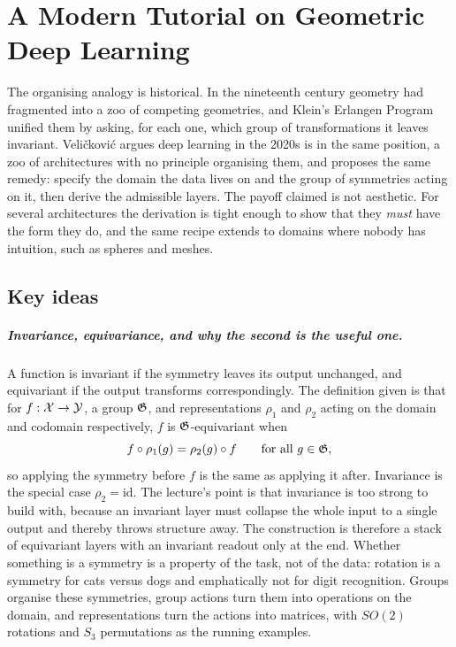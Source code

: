 \chapter{A Modern Tutorial on Geometric Deep Learning}
\label{ch:11-geometric-deep-learning}


The organising analogy is historical. In the nineteenth century geometry had fragmented into a
zoo of competing geometries, and Klein's Erlangen Program unified them by asking, for each one,
which group of transformations it leaves invariant. Veli\v{c}kovi\'{c} argues deep learning in the
2020s is in the same position, a zoo of architectures with no principle organising them, and
proposes the same remedy: specify the domain the data lives on and the group of symmetries acting
on it, then derive the admissible layers. The payoff claimed is not aesthetic. For several
architectures the derivation is tight enough to show that they \emph{must} have the form they do,
and the same recipe extends to domains where nobody has intuition, such as spheres and meshes.

\section*{Key ideas}

\paragraph{Invariance, equivariance, and why the second is the useful one.} A function is invariant
if the symmetry leaves its output unchanged, and equivariant if the output transforms
correspondingly. The definition given is that for $f : \mathcal{X} \to \mathcal{Y}$, a group $\mathfrak{G}$, and
representations $\rho_1$ and $\rho_2$ acting on the domain and codomain respectively, $f$ is
$\mathfrak{G}$-equivariant when
\[
  f \circ \rho_1(g) = \rho_2(g) \circ f
  \qquad \text{for all } g \in \mathfrak{G},
\]
\noindent so applying the symmetry before $f$ is the same as applying it after. Invariance is the
special case $\rho_2 = \mathrm{id}$. The lecture's point is that
invariance is too strong to build with, because an invariant layer must collapse the whole input to
a single output and thereby throws structure away. The construction is therefore a stack of
equivariant layers with an invariant readout only at the end. Whether something is a symmetry is a property of the task, not
of the data: rotation is a symmetry for cats versus dogs and emphatically not for digit
recognition. Groups organise these symmetries, group actions turn them into operations on the
domain, and representations turn the actions into matrices, with $SO(2)$ rotations and $S_3$
permutations as the running examples.

